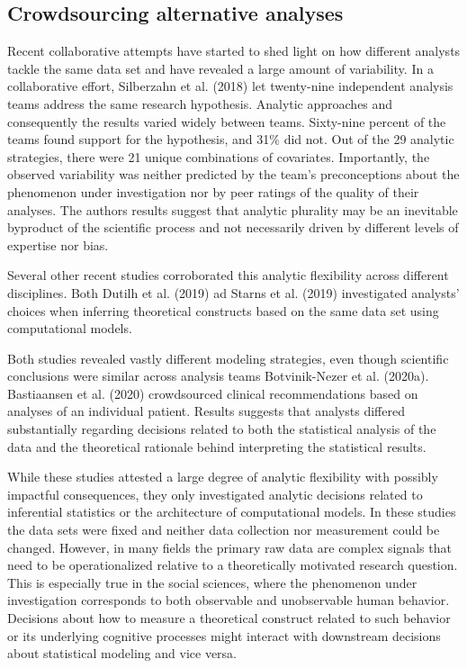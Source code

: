 \documentclass[
  12pt,
]{article}
\begin{document}
\hypertarget{crowdsourcing-alternative-analyses}{%
\subsection{Crowdsourcing alternative analyses}\label{crowdsourcing-alternative-analyses}}

Recent collaborative attempts have started to shed light on how different analysts tackle the same data set and have revealed a large amount of variability.
In a collaborative effort, Silberzahn et al. (2018) let twenty-nine independent analysis teams address the same research hypothesis.
Analytic approaches and consequently the results varied widely between teams.
Sixty-nine percent of the teams found support for the hypothesis, and 31\% did not.
Out of the 29 analytic strategies, there were 21 unique combinations of covariates.
Importantly, the observed variability was neither predicted by the team's preconceptions about the phenomenon under investigation nor by peer ratings of the quality of their analyses.
The authors results suggest that analytic plurality may be an inevitable byproduct of the scientific process and not necessarily driven by different levels of expertise nor bias.

Several other recent studies corroborated this analytic flexibility across different disciplines.
Both Dutilh et al. (2019) ad Starns et al. (2019) investigated analysts' choices when inferring theoretical constructs based on the same data set using computational models.

Both studies revealed vastly different modeling strategies, even though scientific conclusions were similar across analysis teams Botvinik-Nezer et al. (2020a).
Bastiaansen et al. (2020) crowdsourced clinical recommendations based on analyses of an individual patient.
Results suggests that analysts differed substantially regarding decisions related to both the statistical analysis of the data and the theoretical rationale behind interpreting the statistical results.

While these studies attested a large degree of analytic flexibility with possibly impactful consequences, they only investigated analytic decisions related to inferential statistics or the architecture of computational models.
In these studies the data sets were fixed and neither data collection nor measurement could be changed.
However, in many fields the primary raw data are complex signals that need to be operationalized relative to a theoretically motivated research question.
This is especially true in the social sciences, where the phenomenon under investigation corresponds to both observable and unobservable human behavior.
Decisions about how to measure a theoretical construct related to such behavior or its underlying cognitive processes might interact with downstream decisions about statistical modeling and vice versa.
\end{document}
